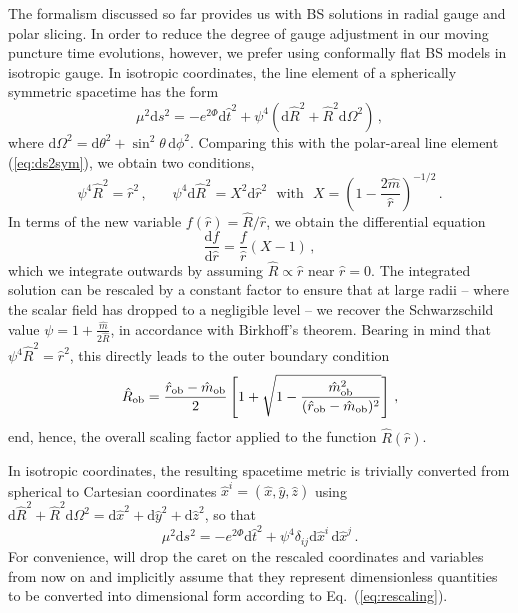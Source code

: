 \documentclass[]{iopart}
\newcommand{\du}{\mathrm{d}}
\newcommand{\us}[1]{\textcolor{teal}{[{\it\textbf{US: #1}}]} }
\renewcommand{\mr}[1]{\textcolor{purple}{[{\it\textbf{MR: #1}}]} }
\begin{document}
The formalism discussed so far provides us with BS solutions
in radial gauge and polar slicing. 
In order to reduce the degree of gauge
adjustment in our moving puncture time evolutions, however,
we prefer using conformally flat
BS models in isotropic gauge. In isotropic coordinates, the line
element of a spherically symmetric spacetime has the form
%
\begin{equation}
  \mu^2 \du s^2 = -e^{2\Phi}\du \hat{t}^2+\psi^4 (\du \hat{R}^2 + \hat{R}^2\du \Omega^2)\,,
  \label{eq:ds2iso}
\end{equation}
%
where $\du \Omega^2=\du\theta^2+\sin^2\theta\,\du \phi^2$. Comparing this
with the polar-areal line element (\ref{eq:ds2sym}), we obtain
two conditions,
%
\begin{equation}
  \psi^4 \hat{R}^2 = \hat{r}^2\,,~~~~~~~~
  \psi^4\du \hat{R}^2=
  X^2 \du \hat{r}^2~~~\text{with}~~~
  X=\left(1-\frac{2\hat{m}}{\hat{r}}\right)^{-1/2}\,.
\end{equation}
%
In terms of the new variable $f(\hat{r})=\hat{R}/\hat{r}$, we obtain the differential equation
%
\begin{equation}
  \frac{\du f}{\du \hat{r}} = \frac{f}{\hat{r}}(X-1)\,,
\end{equation}
%
which we integrate outwards by assuming $\hat{R}\propto \hat{r}$ near $\hat{r}=0$. The
integrated solution can be rescaled by a constant factor to ensure that
at large radii -- where the scalar field has dropped to a negligible level --
we recover the Schwarzschild value
$\psi = 1+\frac{\hat{m}}{2\hat{R}}$, in accordance with Birkhoff's theorem.
Bearing in mind that $\psi^4\hat{R}^2=\hat{r}^2$, this directly leads to
the outer boundary condition
%
\begin{equation}
  \hat{R}_{\rm ob} =
  \frac{\hat{r}_{\rm ob}-\hat{m}_{\rm ob}}{2}
  \left[
  1+
  \sqrt{1-\frac{\hat{m}_{\rm ob}^2}{(\hat{r}_{\rm ob}-\hat{m}_{\rm ob})^2}}
  \right]\,,
\end{equation}
%
end, hence, the overall scaling factor applied to the function $\hat{R}(\hat{r})$.

In isotropic coordinates, the resulting spacetime metric is trivially
converted from spherical to Cartesian coordinates $\hat{x}^i=(\hat{x},\hat{y},\hat{z})$ using
$\du \hat{R}^2 + \hat{R}^2\du \Omega^2=\du \hat{x}^2+\du \hat{y}^2+\du \hat{z}^2$, so that
%
\begin{equation}
  \mu^2 \du s^2 = -e^{2\Phi} \du \hat{t}^2 + \psi^4 \delta_{ij}\du \hat{x}^i \,\du \hat{x}^j
  \,.
\end{equation}
%
For convenience, will drop the caret on the rescaled coordinates
and variables from now on and implicitly assume
that they represent dimensionless quantities to be
converted into dimensional form according to
Eq.~(\ref{eq:rescaling}).
\end{document}
